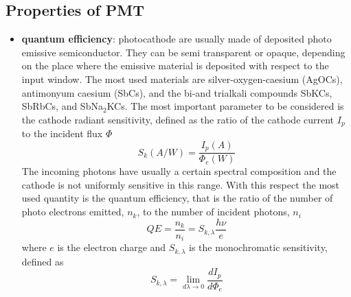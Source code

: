 \subsection{Properties of PMT}
\begin{itemize}
\item \textbf{quantum efficiency}: photocathode are usually made of deposited photo emissive semiconductor. They can be semi transparent or opaque, depending on the place where the emissive material is deposited with respect to the input window.
The most used materials are silver-oxygen-caesium (AgOCs), antimonyum caesium (SbCs), and the bi-and trialkali compounds SbKCs, SbRbCs, and SbNa$_{2}$KCs. The most important parameter to be considered is the cathode radiant sensitivity, defined as the ratio of the cathode current $I_{p}$ to the incident flux $\Phi$
\begin{equation}
S_{k}(A/W)=\frac{I_{p}(A)}{\Phi _{e}(W)}
\end{equation}
The incoming photons have usually a certain spectral composition and the cathode is not uniformly sensitive in this range. With this respect the most used quantity is the quantum efficiency, that is the ratio of the number of photo electrons emitted, $n_{k}$, to the number of incident photons, $n_{i}$
\begin{equation}
QE = \frac{n_{k}}{n_{i}} = S_{k, \lambda} \frac{h\nu}{e}
\end{equation}
where $e$ is the electron charge and $S_{k, \lambda}$ is the monochromatic sensitivity, defined as
\begin{equation}
S_{k, \lambda} = \lim_{d\lambda \to 0}\frac{dI_{p}}{d\Phi _{e}}
\end{equation}


\end{itemize}
